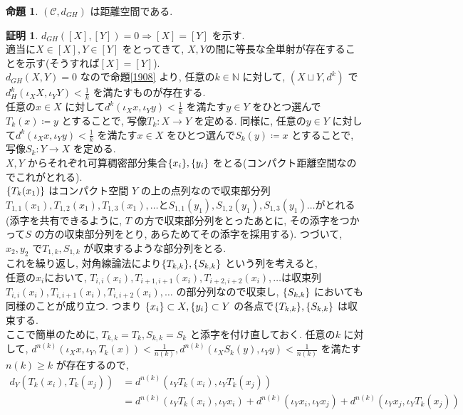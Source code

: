 \documentclass[10pt, fleqn, label-section=none]{bxjsarticle}
\theoremstyle{definition}
\newtheorem{prop}[dfn]{命題}
\newtheorem*{pf*}{証明}
\newcommand{\cbra}[1]{\mleft\{#1\mright\}}
\newcommand{\naraba}{\Rightarrow}
\begin{document}
\begin{prop}
$(\mathcal{C}, d_{GH})$ は距離空間である.
\end{prop}
\begin{pf*}
$d_{GH}([X],[Y]) = 0 \naraba [X] = [Y]$ を示す. \\
適当に$X \in [X], Y \in [Y]$ をとってきて, $X,Y$の間に等長な全単射が存在することを示す(そうすれば$[X] = [Y] $).\\
$d_{GH}(X,Y) = 0$ なので命題\ref{1908} より, 任意の$k \in \mathbb{N}$ に対して, $(X\sqcup Y, d^k)$ で $d_H^k (\iota_X X, \iota_Y Y) < \frac{1}{k}$ を満たすものが存在する. \\
任意の$x \in X$ に対して$d^k(\iota_X x, \iota_Y y) < \frac{1}{k}$ を満たす$y \in Y$ をひとつ選んで$T_k (x) \coloneqq y$ とすることで, 写像$T_k: X \rightarrow  Y$ を定める. 
同様に, 任意の$y \in Y$ に対して$d^k(\iota_X x, \iota_Y y) < \frac{1}{k}$ を満たす$x \in X$ をひとつ選んで$S_k (y) \coloneqq x$ とすることで, 写像$S_k: Y \rightarrow X$ を定める. \\
$X,Y$ からそれぞれ可算稠密部分集合$\cbra{x_i}, \cbra{y_i}$ をとる(コンパクト距離空間なのでこれがとれる). \\
$\cbra{T_k(x_1)}$ はコンパクト空間 $Y$ の上の点列なので収束部分列$T_{1,1}(x_1), T_{1,2}(x_1), T_{1,3}(x_1), \ldots $と$S_{1,1}(y_1), S_{1,2}(y_1), S_{1,3}(y_1)\ldots $がとれる(添字を共有できるように, $T$ の方で収束部分列をとったあとに, その添字をつかって$S$ の方の収束部分列をとり, あらためてその添字を採用する). つづいて, $x_2, y_2$ で$T_{1,k}, S_{1,k}$ が収束するような部分列をとる. \\
これを繰り返し, 対角線論法により$\cbra{T_{k,k}}, \cbra{S_{k,k}}$ という列を考えると, \\
任意の$x_i$において, $T_{i,i}(x_i), T_{i+1,i+1}(x_i), T_{i+2,i+2}(x_i), \ldots $は収束列$T_{i,i}(x_i), T_{i,i+1}(x_i), T_{i,i+2}(x_i), \ldots $ の部分列なので収束し, $\cbra{S_{k,k}}$ においても同様のことが成り立つ. つまり $\cbra{x_i} \subset X, \cbra{y_i} \subset Y$ の各点で$\cbra{T_{k,k}}, \cbra{S_{k,k}}$ は収束する. \\
ここで簡単のために, $T_{k,k} = T_k, S_{k,k} = S_k$ と添字を付け直しておく. 
任意の$k$ に対して, $d^{n(k)} (\iota_X x, \iota_Y, T_k (x) ) < \frac{1}{n(k)} , d^{n(k)} (\iota_X S_k(y), \iota_Y  y ) < \frac{1}{n(k)}$ を満たす$n(k) \geq k$ が存在するので, 
\begin{align*}
d_Y (T_k(x_i), T_k(x_j) ) &= d^{n(k)} (\iota_Y T_k(x_i), \iota_Y T_k(x_j)) \\
&= d^{n(k)} (\iota_Y T_k(x_i), \iota_Y x_i )  + d^{n(k)} (\iota_Y x_i , \iota_Y x_j )  + d^{n(k)} (\iota_Y x_j , \iota_Y T_k(x_j) ) \\

\end{align*}
\end{pf*}
\end{document}
